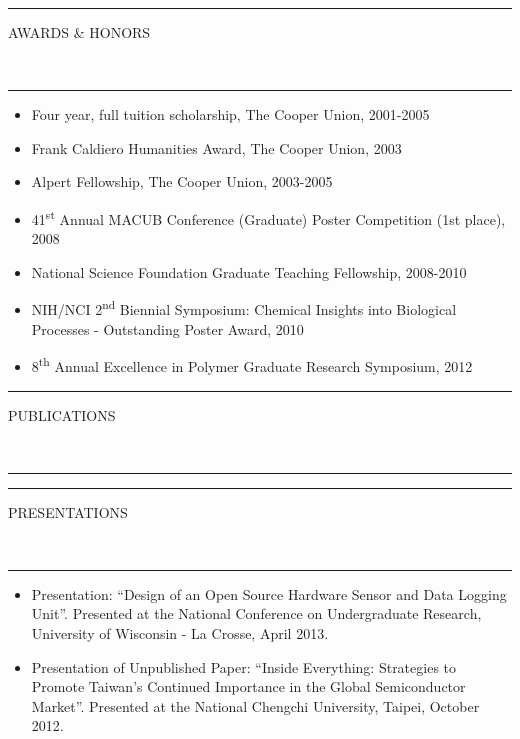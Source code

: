 \documentclass[10pt, letterpaper, oneside]{article}
\newcommand{\HRule}[2]{\textcolor{#1}{\rule{\linewidth}{#2}}}
\newcommand{\sectiontitle}[1]{\begin{minipage}{\textwidth}\HRule{black}{0.25mm}\vspace{-10pt}\begin{center}\Large\MakeUppercase{#1}\end{center}\end{minipage}\\\HRule{light-grey}{0.15mm}\vspace{\baselineskip}}
\newenvironment{tightressection}[1]{
  \begin{minipage}{\textwidth}
  \sectiontitle{#1}}
  {\vspace{\baselineskip}\end{minipage}}
\newenvironment{rescolumn}{
  \begin{minipage}{0.5\textwidth}
    \begin{itemize}[noitemsep,nolistsep]}
  {\end{itemize}
    \end{minipage}}
\newcommand{\resitem}[1]{
	\vspace{2pt}
	\item \begin{flushleft} #1 \end{flushleft}
}
\begin{document}
\vspace{\baselineskip}
\begin{tightressection}{awards \& honors}
  \begin{rescolumn}
      \resitem{Four year, full tuition scholarship, The Cooper Union, 2001-2005}
      \resitem{Frank Caldiero Humanities Award, The Cooper Union, 2003}
      \resitem{Alpert Fellowship, The Cooper Union, 2003-2005}
      \resitem{41\textsuperscript{st} Annual MACUB Conference (Graduate) Poster Competition (1st place), 2008}
    \end{rescolumn}
  \begin{rescolumn}
      \resitem{National Science Foundation Graduate Teaching Fellowship, 2008-2010}
      \resitem{NIH/NCI 2\textsuperscript{nd} Biennial Symposium: Chemical Insights into Biological Processes - Outstanding Poster Award, 2010}
      \resitem{8\textsuperscript{th} Annual Excellence in Polymer Graduate Research Symposium, 2012}
    \end{rescolumn}
\end{tightressection}

\begin{tightressection}{publications}
    \vspace{-2\baselineskip}
    \nocite{*}
    
    
\end{tightressection}

\begin{tightressection}{presentations}
    \vspace{-2\baselineskip}
  \begin{itemize}[noitemsep,nolistsep]
    \resitem{Presentation: ``Design of an Open Source Hardware Sensor and Data Logging Unit''.  Presented at the National Conference on Undergraduate Research, University of Wisconsin - La Crosse, April 2013.}
    \resitem{Presentation of Unpublished Paper: ``Inside Everything: Strategies to Promote Taiwan's Continued Importance in the Global Semiconductor Market''. Presented at the National Chengchi University, Taipei, October 2012.}
  \end{itemize}
\end{tightressection}
\end{document}
